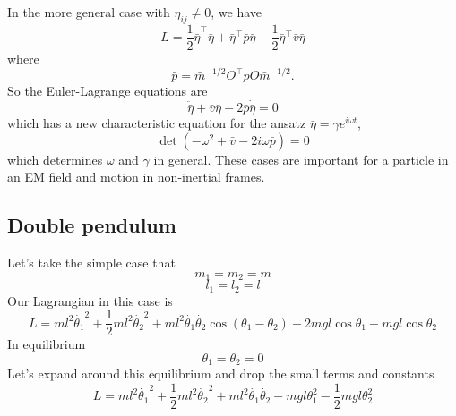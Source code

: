 In the more general case with $\eta_{ij} \neq 0$, we have
\begin{equation}
L = \frac{1}{2} \dot{\bar{\eta}}^\top \bar{\eta} + \bar{\eta}^\top \bar{p} \dot{\bar{\eta}} - \frac{1}{2} \bar{\eta}^\top \bar{v} \bar{\eta}
\end{equation}
where
\begin{equation}
\bar{p} = \bar{m}^{-1/2} O^\top p O \bar{m}^{-1/2}.
\end{equation}
So the Euler-Lagrange equations are
\begin{equation}
\ddot{\bar{\eta}} + \bar{v} \bar{\eta} - 2 \bar{p} \dot{\bar{\eta}} = 0
\end{equation}
which has a new characteristic equation for the ansatz $\bar{\eta} = \gamma e^{i\omega t}$,
\begin{equation}
\det (-\omega^2 + \bar{v} - 2i \omega \bar{p}) = 0
\end{equation}
which determines $\omega$ and $\gamma$ in general. These cases are important for a particle in an EM field and motion in non-inertial frames. 


\subsection{Double pendulum}

Let's take the simple case that
\begin{equation}
m_1 = m_2 = m
\end{equation}
\begin{equation}
l_1 = l_2 = l
\end{equation}
Our Lagrangian in this case is
\begin{equation}
L = ml^2 \dot{\theta_1}^2 + \frac{1}{2}ml^2 \dot{\theta_2}^2 + ml^2 \dot{\theta_1}\dot{\theta_2} \cos(\theta_1 - \theta_2) + 2mgl \cos \theta_1 + mgl\cos\theta_2
\end{equation}
In equilibrium
\begin{equation}
\theta_1 = \theta_2 = 0
\end{equation}
Let's expand around  this equilibrium and drop the small terms and constants
\begin{equation}
L = ml^2 \dot{\theta_1}^2 + \frac{1}{2} ml^2 \dot{\theta_2}^2  + ml^2 \dot{\theta_1} \dot{\theta_2} - mgl \theta_1^2 - \frac{1}{2} mgl\theta_2^2
\end{equation}

